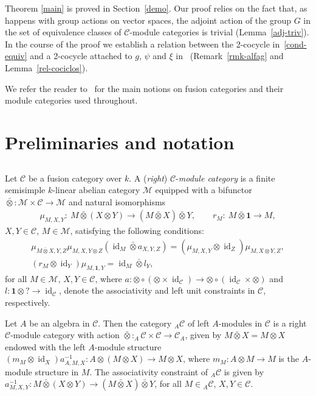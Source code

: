 \documentclass[11pt]{article}
\numberwithin{equation}{section}
\newcommand{\oot}{\bar\otimes}
\newcommand{\C}{{\mathcal C}}
\newcommand{\M}{{\mathcal M}}
\newcommand{\1}{\textbf{1}}
\newcommand\id{\operatorname{id}}
\begin{document}
Theorem \ref{main} is proved in Section~\ref{demo}. Our proof relies on the fact that, as happens with group actions on vector spaces, the adjoint action of the group $G$ in the set of equivalence classes of $\C$-module categories is trivial (Lemma~\ref{adj-triv}). In the course of the proof we establish a relation between the 2-cocycle in~\eqref{cond-equiv} and a 2-cocycle attached to $g$, $\psi$ and $\xi$ in~\cite{ostrik} (Remark~\ref{rmk-alfag} and Lemma~\ref{rel-cociclos}).

We refer the reader to~\cite{egno} for the main notions on fusion categories and their module categories used throughout.

\section{Preliminaries and notation}\label{prels}

\subsection{}
Let $\mathcal{C}$ be a fusion category over $k$. A (\emph{right}) $\C$-\emph{module category} is a f\/inite semisimple $k$-linear abelian category $\mathcal{M}$ equipped with a bifunctor $\oot\colon \mathcal{M}\times \mathcal{C} \rightarrow\mathcal{M}$ and natural isomorphisms
\begin{gather*}\mu_{M, X,Y}\colon \ M \oot (X\otimes Y)\rightarrow (M\oot X)\oot Y,\qquad r_M\colon \ M \oot \textbf{1}\rightarrow M, \end{gather*}
$X, Y \in \C$, $M \in \mathcal M$, satisfying the following conditions:
\begin{gather} \label{modcat1} \mu_{M\oot X, Y, Z} \mu_{M, X, Y \otimes Z} ( \id_M \oot a_{X, Y, Z} ) =
 (\mu_{M, X, Y} \otimes \id_Z ) \mu_{M, X\otimes Y, Z},\\
 \label{modcat2} (r_M \otimes \id_Y ) \mu_{M, \1, Y} = \id_M \oot l_Y,
\end{gather}
for all $M \in \M$, $X, Y \in \C$, where $a\colon \otimes \circ (\otimes \times \id_\C) \to \otimes \circ (\id_\C \times \otimes)$ and $l\colon \textbf{1} \otimes ? \to \id_\C$, denote the associativity and left unit constraints in $\C$, respectively.

Let $A$ be an algebra in $\C$. Then the category $_A\C$ of left $A$-modules in $\C$ is a right $\C$-module category with action $\oot\colon _A\C \times \C \to \C_A$, given by $M\oot X = M\otimes X$ endowed with the left $A$-module structure $(m_M \otimes \id_X) a_{A, M, X}^{-1}\colon A\otimes (M\otimes X) \to M\otimes X$, where $m_M\colon A\otimes M \to M$ is the $A$-module structure in $M$. The associativity constraint of $_A\C$ is given by $a^{-1}_{M, X, Y}\colon M\oot (X \otimes Y) \to (M\oot X) \oot Y$, for all $M \in {} _A\C$, $X, Y \in \C$.
\end{document}
